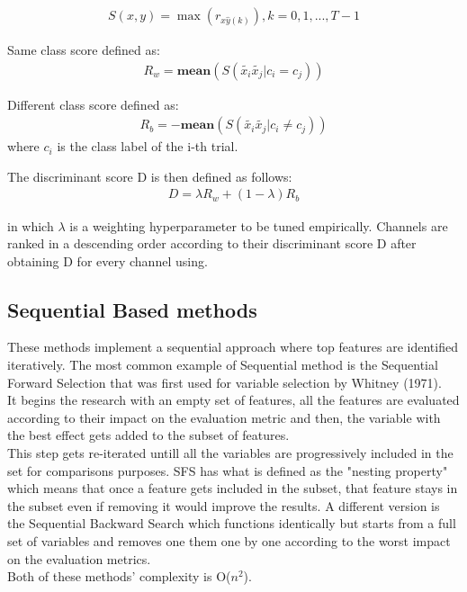 \documentclass{Configuration_Files/PoliMi3i_thesis}
\begin{document}
\begin{align}
	S(x,y) = \max(r_{x\hat{y}(k)}), k=0,1,..., T - 1 
   \label{eq:XCDC_01}
\end{align}

Same class score defined as:
\begin{align}
	R_w = \mathbf{mean}(S(\tilde{x_i}\tilde{x_j}| c_i = c_j))
   \label{eq:XCDC4}
\end{align}

Different class score defined as:
\begin{align}
	R_b = -\mathbf{mean}(S(\tilde{x_i}\tilde{x_j}| c_i \neq  c_j))
   \label{eq:XCDC5}
\end{align}
where $c_i$ is the class label of the i-th trial.

The discriminant score D is then defined as follows:
\begin{align}
	D = \lambda R_w + (1-\lambda)R_b
   \label{eq:XCDC6}
\end{align}

in which $\lambda$ is a weighting hyperparameter to be tuned empirically.
Channels are ranked in a descending order according to their discriminant score D after obtaining D for every channel using.


\subsection{Sequential Based methods}

These methods implement a sequential approach where top features are identified iteratively.
The most common example of Sequential method is the Sequential Forward Selection that was first used for variable selection by Whitney (1971). \\
It begins the research with an empty set of features, all the features are evaluated according to their impact on the evaluation metric and then, the variable with the best effect gets added to the subset of features. \\
This step gets re-iterated untill all the variables are progressively included in the set for comparisons purposes.
SFS has what is defined as the "nesting property" which means that once a feature gets included in the subset, that feature stays in the subset even if removing it would improve the results.  \cite{reunanenOverfittingMakingComparisons}
A different version is the Sequential Backward Search which functions identically but starts from a full set of variables and removes one them one by one according to the worst impact on the evaluation metrics. \cite{pudilFloatingSearchMethods1994} \\
Both of these methods' complexity is O($n^2$). \cite{kudoComparisonAlgorithmsThat2000}
\end{document}
